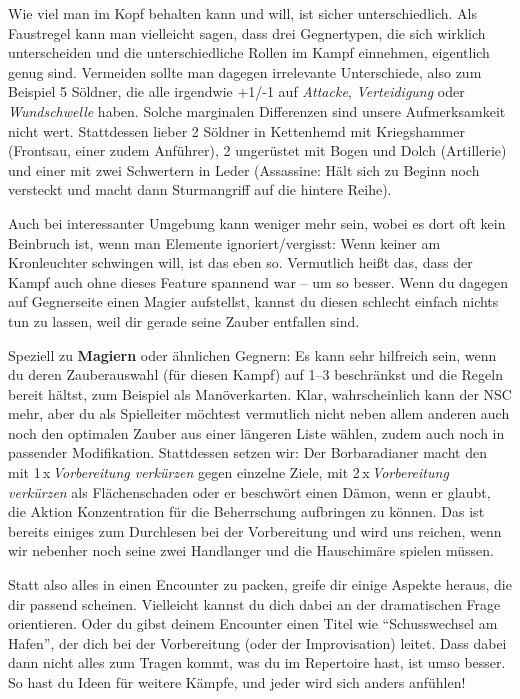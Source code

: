 Wie viel man im Kopf behalten kann und will, ist sicher unterschiedlich.
Als Faustregel kann man vielleicht sagen, dass drei Gegnertypen, die sich wirklich unterscheiden und die unterschiedliche Rollen im Kampf einnehmen, eigentlich genug sind.
Vermeiden sollte man dagegen irrelevante Unterschiede, also zum Beispiel 5 Söldner, die alle irgendwie +1/-1 auf \textit{Attacke}, \textit{Verteidigung} oder \textit{Wundschwelle} haben.
 Solche marginalen Differenzen sind unsere Aufmerksamkeit nicht wert. Stattdessen lieber 2 Söldner in Kettenhemd mit Kriegshammer (Frontsau, einer zudem Anführer), 2 ungerüstet mit Bogen und Dolch (Artillerie) und einer mit zwei Schwertern in Leder (Assassine: Hält sich zu Beginn noch versteckt und macht dann Sturmangriff auf die hintere Reihe).
 
 \neueseite
 
  Auch bei interessanter Umgebung kann weniger mehr sein, wobei es dort oft kein Beinbruch ist, wenn man Elemente ignoriert/vergisst:
  Wenn keiner am Kronleuchter schwingen will, ist das eben so.
  Vermutlich heißt das, dass der Kampf auch ohne dieses Feature spannend war -- um so besser.
  Wenn du dagegen auf Gegnerseite einen Magier aufstellst, kannst du diesen schlecht einfach nichts tun zu lassen, weil dir gerade seine Zauber entfallen sind.

\bigskip

Speziell zu \textbf{Magiern} oder ähnlichen Gegnern:
Es kann sehr hilfreich sein, wenn du deren Zauberauswahl (für diesen Kampf) auf 1--3 beschränkst und die Regeln bereit hältst, zum Beispiel als Manöverkarten.
Klar, wahrscheinlich kann der NSC mehr, aber du als Spielleiter möchtest vermutlich nicht neben allem anderen auch noch den optimalen Zauber aus einer längeren Liste wählen, zudem auch noch in passender Modifikation.
Stattdessen setzen wir: Der Borbaradianer macht den  mit 1\,x\,\textit{Vorbereitung verkürzen} gegen einzelne Ziele,  mit 2\,x\,\textit{Vorbereitung verkürzen}  als Flächenschaden oder er beschwört einen Dämon, wenn er glaubt, die Aktion Konzentration für die Beherrschung aufbringen zu können.
Das ist bereits einiges zum Durchlesen bei der Vorbereitung und wird uns reichen, wenn wir nebenher noch seine zwei Handlanger und die Hauschimäre spielen müssen. 

\bigskip

Statt also alles in einen Encounter zu packen, greife dir einige Aspekte heraus, die dir passend scheinen. Vielleicht kannst du dich dabei an der dramatischen Frage orientieren.
Oder du gibst deinem Encounter einen Titel wie \enquote{Schusswechsel am Hafen}, der dich bei der Vorbereitung (oder der Improvisation) leitet.
Dass dabei dann nicht alles zum Tragen kommt, was du im Repertoire hast, ist umso besser.
So hast du Ideen für weitere Kämpfe, und jeder wird sich anders anfühlen!

